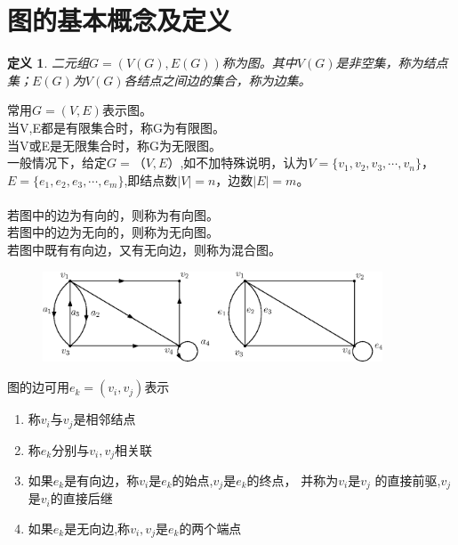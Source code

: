 \documentclass[11pt,a4paper,openany]{book}
\newtheorem{defination}{\textbf{定义}}[section]
\begin{document}
\section{图的基本概念及定义}
\begin{defination}
二元组$G=(V(G),E(G))$称为图。其中$V(G)$是非空集，称为结点集；$E(G)$为$V(G)$各结点之间边的集合，称为边集。\\
\end{defination}
\noindent 常用$G=(V,E)$表示图。\\
当V,E都是有限集合时，称G为\textcolor[rgb]{1.00,0.00,0.00}{有限图}。\\
当V或E是无限集合时，称G为\textcolor[rgb]{1.00,0.00,0.00}{无限图}。\\
一般情况下，给定$G=（V,E）$,如不加特殊说明，认为$V=\{v_1,v_2,v_3,\cdots,v_n\}$，$E=\{e_1,e_2,e_3,\cdots,e_m\}$,即结点数$|V|=n$，边数$|E|=m$。\\
\\
若图中的边为有向的，则称为有向图。\\
若图中的边为无向的，则称为无向图。\\
若图中既有有向边，又有无向边，则称为混合图。\\
\begin{figure}[H]
  \centering
  \includegraphics[width=0.9\textwidth]{1_3.eps}\\
  \caption{}
\end{figure}
\noindent 图的边可用$e_k=(v_i,v_j)$表示\\
\vspace{-20pt}
\begin{enumerate}
  \item 称$v_i$与$v_j$是\textcolor[rgb]{1.00,0.00,0.00}{相邻结点}
  \item 称$e_k$分别与$v_i,v_j$\textcolor[rgb]{1.00,0.00,0.00}{相关联}
  \item 如果$e_k$是有向边，称$v_i$是$e_k$的\textcolor[rgb]{1.00,0.00,0.00}{始点},$v_j$是$e_k$的\textcolor[rgb]{1.00,0.00,0.00}{终点}，
  并称为$v_i$是$v_j$ 的\textcolor[rgb]{1.00,0.00,0.00}{直接前驱},$v_j$是$v_i$的\textcolor[rgb]{1.00,0.00,0.00}{直接后继}
  \item 如果$e_k$是无向边,称$v_i,v_j$是$e_k$的两个\textcolor[rgb]{1.00,0.00,0.00}{端点}
\end{enumerate}
\end{document}
